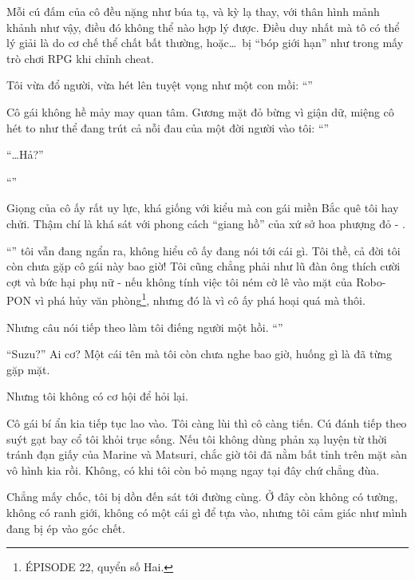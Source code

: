 \documentclass[../main.tex]{subfiles}
\begin{document}
Mỗi cú đấm của cô đều nặng như búa tạ, và kỳ lạ thay, với thân hình mảnh khảnh như vậy, điều đó không thể nào hợp lý được. Điều duy nhất mà tô có thể lý giải là do cơ chế thể chất bất thường, hoặc\dots\ bị ``bóp giới hạn'' như trong mấy trò chơi RPG khi chỉnh cheat.

Tôi vừa đổ người, vừa hét lên tuyệt vọng như một con mồi: ``''

Cô gái không hề mảy may quan tâm. Gương mặt đỏ bừng vì giận dữ, miệng cô hét to như thể đang trút cả nỗi đau của một đời người vào tôi: ``''

``\dots Hả?''

``''

Giọng của cô ấy rất uy lực, khá giống với kiểu mà con gái miền Bắc quê tôi hay chửi. Thậm chí là khá sát với phong cách ``giang hồ'' của xứ sở hoa phượng đỏ - .

``'' tôi vẫn đang ngẩn ra, không hiểu cô ấy đang nói tới cái gì. Tôi thề, cả đời tôi còn chưa gặp cô gái này bao giờ! Tôi cũng chẳng phải như lũ đàn ông thích cười cợt và bức hại phụ nữ - nếu không tính việc tôi ném cờ lê vào mặt của Robo-PON vì phá hủy văn phòng\footnote{{\flaregothic ÉPISODE 22}, quyển số Hai.}, nhưng đó là vì cô ấy phá hoại quá mà thôi.

Nhưng câu nói tiếp theo làm tôi điếng người một hồi. ``''

``Suzu?'' Ai cơ? Một cái tên mà tôi còn chưa nghe bao giờ, huống gì là đã từng gặp mặt.

Nhưng tôi không có cơ hội để hỏi lại.

Cô gái bí ẩn kia tiếp tục lao vào. Tôi càng lùi thì cô càng tiến. Cú đánh tiếp theo suýt gạt bay cổ tôi khỏi trục sống. Nếu tôi không dùng phản xạ luyện từ thời tránh đạn giấy của Marine và Matsuri, chắc giờ tôi đã nằm bất tỉnh trên mặt sàn vô hình kia rồi. Không, có khi tôi còn bỏ mạng ngay tại đây chứ chẳng đùa.

Chẳng mấy chốc, tôi bị dồn đến sát tới đường cùng. Ở đây còn không có tường, không có ranh giới, không có một cái gì để tựa vào, nhưng tôi cảm giác như mình đang bị ép vào góc chết.
\end{document}
